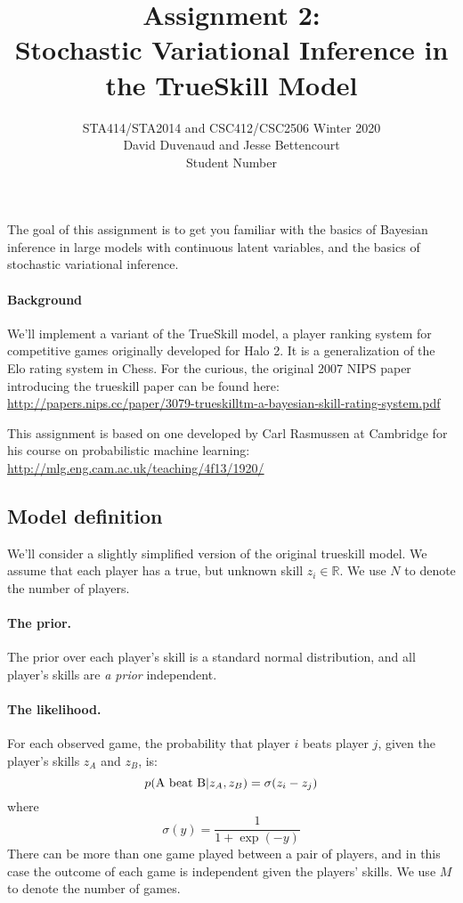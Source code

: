 \documentclass{article}
\begin{document}
\title{Assignment 2:\\Stochastic Variational Inference in the TrueSkill Model}
\author{STA414/STA2014 and CSC412/CSC2506 Winter 2020\\
  David Duvenaud and Jesse Bettencourt\\
  Student Number
}
\maketitle

The goal of this assignment is to get you familiar with the basics of
Bayesian inference in large models with continuous latent variables, and the basics of stochastic variational inference.

\paragraph{Background}
We'll implement a variant of the TrueSkill model, a player ranking system for competitive games originally developed for Halo 2.
It is a generalization of the Elo rating system in Chess.
For the curious, the original 2007 NIPS paper introducing the trueskill paper can be found here:
\url{http://papers.nips.cc/paper/3079-trueskilltm-a-bayesian-skill-rating-system.pdf}

This assignment is based on one developed by Carl Rasmussen at Cambridge for his course on probabilistic machine learning:
\url{http://mlg.eng.cam.ac.uk/teaching/4f13/1920/}


\subsection{Model definition}
We'll consider a slightly simplified version of the original trueskill model.
We assume that each player has a true, but unknown skill $z_i \in \mathbb{R}$.
We use $N$ to denote the number of players.

\paragraph{The prior.}
The prior over each player's skill is a standard normal distribution, and all player's skills are \emph{a prior} independent.  

\paragraph{The likelihood.}
For each observed game, the probability that player $i$ beats player $j$, given the player's skills $z_A$ and $z_B$, is:
$$p(\textnormal{A beat B} | z_A, z_B) = \sigma(z_i - z_j)$$
where
$$\sigma(y) = \frac{1}{1 + \exp(-y)}$$
There can be more than one game played between a pair of players, and in this case the outcome of each game is independent given the players' skills.
We use $M$ to denote the number of games.
\end{document}
